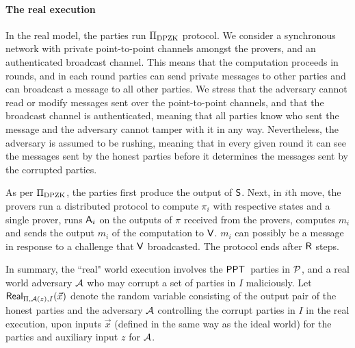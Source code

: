 \paragraph{The real execution} In the real model, the parties run $\Pi_{\text{DPZK}}$ protocol.  We consider a synchronous network with private point-to-point channels amongst the provers, and an authenticated broadcast channel. This means that the computation proceeds in rounds, and in each round parties can send private messages to other parties and can broadcast a message to all other parties. We stress that the adversary cannot read or modify messages sent over the point-to-point channels, and that the broadcast channel is authenticated, meaning that all parties know who sent the message and the adversary cannot tamper with it in any way. Nevertheless, the adversary is assumed to be rushing, meaning that in every given round it can see the messages sent by the honest parties before it determines the messages sent by the corrupted parties. 

As per $\Pi_{\text{DPZK}}$, the parties first produce the output of $\mathsf{S}$. Next, in $i$th move,  the  provers run a distributed protocol to compute $\pi_i$ with respective states and a single prover, runs $\mathsf{A}_i$ on the outputs of $\pi$ received from the provers, computes $m_i$ and sends the output $m_i$ of the computation to $\mathsf{V}$. $m_i$ can possibly be  a message in response to a challenge that $\mathsf{V}$ broadcasted. The protocol ends after $\mathsf{R}$ steps.

In summary,  the ``real" world execution involves the $\mathsf{PPT}$\ parties  in $\mathcal{P}$,  and a real world adversary $\mathcal{A}$ who may corrupt  a set of parties in $I$ maliciously.  Let $\mathsf{Real}_{\Pi, \mathcal{A}(z),I}(\vec{x})$ denote the random variable consisting of the output pair of the honest parties and the adversary $\mathcal{A}$ controlling the corrupt parties in $I$ in the real execution, upon inputs $\vec{x}$ (defined in the same way as the ideal world) for the parties and auxiliary input $z$ for $\mathcal{A}$. 


